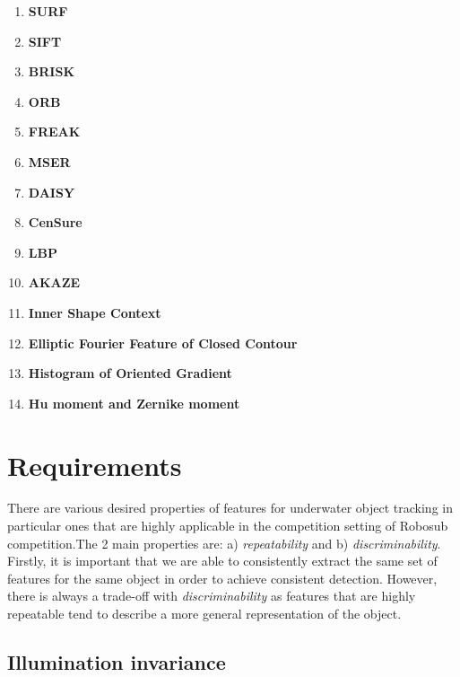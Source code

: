 \documentclass[hyp]{socreport}
\begin{document}
\begin{enumerate}
  \item \textbf{SURF} 
  \item \textbf{SIFT} 
  \item \textbf{BRISK} 
  \item \textbf{ORB} 
  \item \textbf{FREAK} 
  \item \textbf{MSER} 
  \item \textbf{DAISY} 
  \item \textbf{CenSure} 
  \item \textbf{LBP} 
  \item \textbf{AKAZE} 
  \item \textbf{Inner Shape Context} 
  \item \textbf{Elliptic Fourier Feature of Closed Contour} 
  \item \textbf{Histogram of Oriented Gradient} 
  \item \textbf{Hu moment and Zernike moment} 
\end{enumerate}

\section{Requirements}

There are various desired properties of features for underwater object tracking
in particular ones that are highly applicable in the competition setting of
Robosub competition.The 2 main properties are: a) \textit{repeatability} and b)
\textit{discriminability}. Firstly, it is important that we are able to
consistently extract the same set of features for the same object in order to
achieve consistent detection. However, there is always a trade-off with
\textit{discriminability} as features that are highly repeatable tend to
describe a more general representation of the object.

\subsection{Illumination invariance}
\end{document}
